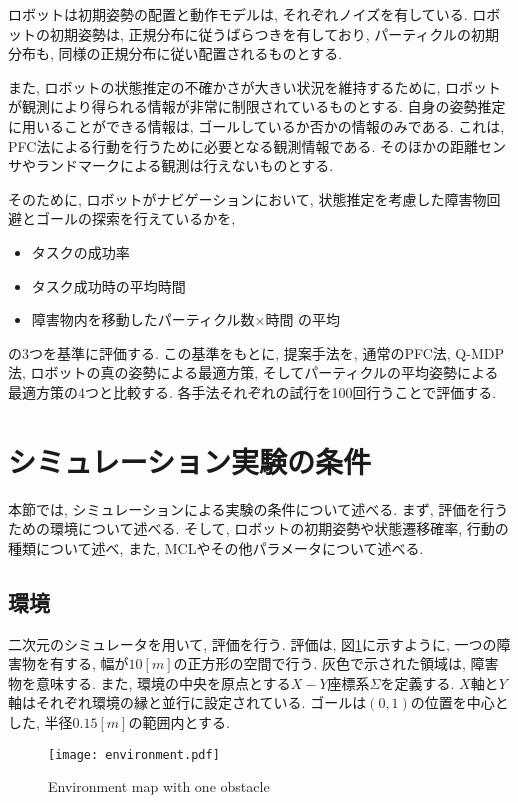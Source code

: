 ロボットは初期姿勢の配置と動作モデルは, それぞれノイズを有している. 
ロボットの初期姿勢は, 正規分布に従うばらつきを有しており, 
パーティクルの初期分布も, 同様の正規分布に従い配置されるものとする. 

また, ロボットの状態推定の不確かさが大きい状況を維持するために, 
ロボットが観測により得られる情報が非常に制限されているものとする. 
自身の姿勢推定に用いることができる情報は, ゴールしているか否かの情報のみである. 
これは, PFC法による行動を行うために必要となる観測情報である. 
そのほかの距離センサやランドマークによる観測は行えないものとする. 

そのために, ロボットがナビゲーションにおいて, 状態推定を考慮した障害物回避とゴールの探索を行えているかを, 
\begin{itemize}
  \item タスクの成功率
  \item タスク成功時の平均時間
  \item 障害物内を移動したパーティクル数×時間 の平均
\end{itemize}
の3つを基準に評価する. 
この基準をもとに, 提案手法を, 通常のPFC法, Q-MDP法, ロボットの真の姿勢による最適方策, 
そしてパーティクルの平均姿勢による最適方策の4つと比較する. 
各手法それぞれの試行を100回行うことで評価する. 


\section{シミュレーション実験の条件} \label{section:実験条件}
本節では, シミュレーションによる実験の条件について述べる. 
まず, 評価を行うための環境について述べる. 
そして, ロボットの初期姿勢や状態遷移確率, 行動の種類について述べ, また, MCLやその他パラメータについて述べる. 

\subsection{環境}
二次元のシミュレータを用いて, 評価を行う. 
評価は, 図\ref{fig:environment}に示すように, 一つの障害物を有する, 幅が$10[\si{m}]$の正方形の空間で行う. 
灰色で示された領域は, 障害物を意味する. 
また, 環境の中央を原点とする$X-Y$座標系$\Sigma$を定義する. 
$X$軸と$Y$軸はそれぞれ環境の縁と並行に設定されている. 
ゴールは$(0, 1)$の位置を中心とした, 半径$0.15[\si{m}]$の範囲内とする. 
\begin{figure}[H]
  \begin{center}
    \texttt{[image: environment.pdf]}
    \caption{Environment map with one obstacle}
    \label{fig:environment}
  \end{center}
\end{figure}

